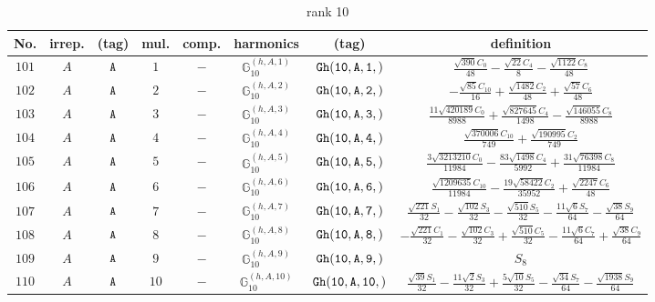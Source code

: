 \documentclass[fleqn,8pt]{jsarticle}
\begin{document}
\begin{table}[ht!]
\begin{center}
\caption{rank 10}
\renewcommand{\arraystretch}{1.3}
\begin{tabular}{cccccccc} \hline \hline
No. & irrep. & (tag) & mul. & comp. & harmonics & (tag) & definition \\ \hline
$ 101 $ & $ A $ & $ {\tt A} $ & $ 1 $ & $ - $ & $ \mathbb{G}_{10}^{(h,A,1)} $ & $ {\tt Gh(10,A,1,)} $ & $ \frac{\sqrt{390} C_{0}}{48} - \frac{\sqrt{22} C_{4}}{8} - \frac{\sqrt{1122} C_{8}}{48} $ \\
$ 102 $ & $ A $ & $ {\tt A} $ & $ 2 $ & $ - $ & $ \mathbb{G}_{10}^{(h,A,2)} $ & $ {\tt Gh(10,A,2,)} $ & $ - \frac{\sqrt{85} C_{10}}{16} + \frac{\sqrt{1482} C_{2}}{48} + \frac{\sqrt{57} C_{6}}{48} $ \\
$ 103 $ & $ A $ & $ {\tt A} $ & $ 3 $ & $ - $ & $ \mathbb{G}_{10}^{(h,A,3)} $ & $ {\tt Gh(10,A,3,)} $ & $ \frac{11 \sqrt{420189} C_{0}}{8988} + \frac{\sqrt{827645} C_{4}}{1498} - \frac{\sqrt{146055} C_{8}}{8988} $ \\
$ 104 $ & $ A $ & $ {\tt A} $ & $ 4 $ & $ - $ & $ \mathbb{G}_{10}^{(h,A,4)} $ & $ {\tt Gh(10,A,4,)} $ & $ \frac{\sqrt{370006} C_{10}}{749} + \frac{\sqrt{190995} C_{2}}{749} $ \\
$ 105 $ & $ A $ & $ {\tt A} $ & $ 5 $ & $ - $ & $ \mathbb{G}_{10}^{(h,A,5)} $ & $ {\tt Gh(10,A,5,)} $ & $ \frac{3 \sqrt{3213210} C_{0}}{11984} - \frac{83 \sqrt{1498} C_{4}}{5992} + \frac{31 \sqrt{76398} C_{8}}{11984} $ \\
$ 106 $ & $ A $ & $ {\tt A} $ & $ 6 $ & $ - $ & $ \mathbb{G}_{10}^{(h,A,6)} $ & $ {\tt Gh(10,A,6,)} $ & $ \frac{\sqrt{1209635} C_{10}}{11984} - \frac{19 \sqrt{58422} C_{2}}{35952} + \frac{\sqrt{2247} C_{6}}{48} $ \\
$ 107 $ & $ A $ & $ {\tt A} $ & $ 7 $ & $ - $ & $ \mathbb{G}_{10}^{(h,A,7)} $ & $ {\tt Gh(10,A,7,)} $ & $ \frac{\sqrt{221} S_{1}}{32} - \frac{\sqrt{102} S_{3}}{32} - \frac{\sqrt{510} S_{5}}{32} - \frac{11 \sqrt{6} S_{7}}{64} - \frac{\sqrt{38} S_{9}}{64} $ \\
$ 108 $ & $ A $ & $ {\tt A} $ & $ 8 $ & $ - $ & $ \mathbb{G}_{10}^{(h,A,8)} $ & $ {\tt Gh(10,A,8,)} $ & $ - \frac{\sqrt{221} C_{1}}{32} - \frac{\sqrt{102} C_{3}}{32} + \frac{\sqrt{510} C_{5}}{32} - \frac{11 \sqrt{6} C_{7}}{64} + \frac{\sqrt{38} C_{9}}{64} $ \\
$ 109 $ & $ A $ & $ {\tt A} $ & $ 9 $ & $ - $ & $ \mathbb{G}_{10}^{(h,A,9)} $ & $ {\tt Gh(10,A,9,)} $ & $ S_{8} $ \\
$ 110 $ & $ A $ & $ {\tt A} $ & $ 10 $ & $ - $ & $ \mathbb{G}_{10}^{(h,A,10)} $ & $ {\tt Gh(10,A,10,)} $ & $ \frac{\sqrt{39} S_{1}}{32} - \frac{11 \sqrt{2} S_{3}}{32} + \frac{5 \sqrt{10} S_{5}}{32} - \frac{\sqrt{34} S_{7}}{64} - \frac{\sqrt{1938} S_{9}}{64} $ \\

\end{tabular}
\end{center}
\end{table}
\end{document}
